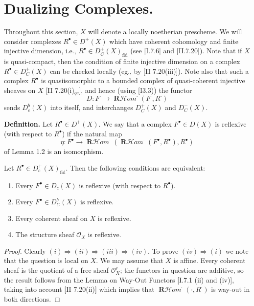 \documentclass[12pt]{book}
\newcommand{\sheaf}[1]{\mathcal{#1}}
\DeclareMathOperator{\RHom}{\mathbf{R}\mathcal{H}\textit{om}}
\begin{document}
\setcounter{page}{257}
\section{Dualizing Complexes.}

Throughout this section, \(X\) will denote a locally noetherian prescheme. We will consider complexes \(R^{\bullet} \in D^{+}(X)\) which have coherent cohomology and finite injective dimension, i.e., \(R^{\bullet} \in D_{C}^{+}(X)_{\text{fid}}\) (see [I.7.6] and [II.7.20]). Note that if \(X\) is quasi-compact, then the condition of finite injective dimension on a complex \(R^{\bullet} \in D_{C}^{+}(X)\) can be checked locally (eg., by [II 7.20(iii)]). Note also that such a complex \(R^{\bullet}\) is quasiisomorphic to a bounded complex of quasi-coherent injective sheaves on \(X\) [II 7.20(i)\(_{qc}\)], and hence (using [I3.3)) the functor
\[
D: F^{\cdot} \to \RHom^{\cdot}\left(F^{\cdot}, R^{\cdot}\right)
\]
sends \(D_{c}^{b}(X)\) into itself, and interchanges \(D_{C}^{+}(X)\) and \(D_{C}^{-}(X)\).

\textbf{Definition.} Let \(R^{\bullet} \in D^{+}(X)\). We say that a complex \(F^{\bullet} \in D(X)\) is reflexive (with respect to \(R^{\bullet}\)) if the natural map
\[
\eta: F^{\bullet} \to \RHom^{\cdot}\left(\RHom^{\cdot}\left(F^{\bullet}, R^{\bullet}\right), R^{\bullet}\right)
\]
of Lemma 1.2 is an isomorphism.

\setcounter{page}{258}
\begin{proposition}
Let \(R^{\bullet} \in D_{c}^{+}(X)_{\text{fid}}\). Then the following conditions are equivalent:
\begin{enumerate}
\item[(i)] Every \(F^{\bullet} \in D_{c}(X)\) is reflexive (with respect to \(R^{\bullet}\)).
\item[(ii)] Every \(F^{\bullet} \in D_{C}^{b}(X)\) is reflexive.
\item[(iii)] Every coherent sheaf on \(X\) is reflexive.
\item[(iv)] The structure sheaf \(\sheaf{O}_{X}\) is reflexive.
\end{enumerate}
\end{proposition}

\begin{proof}
Clearly \((i) \Rightarrow (ii) \Rightarrow (iii) \Rightarrow (iv)\). To prove \((iv)\Rightarrow(i)\) we note that the question is local on \(X\). We may assume that \(X\) is affine. Every coherent sheaf is the quotient of a free sheaf \(\sheaf{O}_{X}^{r}\); the functors in question are additive, so the result follows from the Lemma on Way-Out Functors [I.7.1 (ii) and (iv)], taking into account [II 7.20(ii)] which implies that \(\RHom^{\cdot}(\cdot, R^{\cdot})\) is way-out in both directions.
\end{proof}
\end{document}
